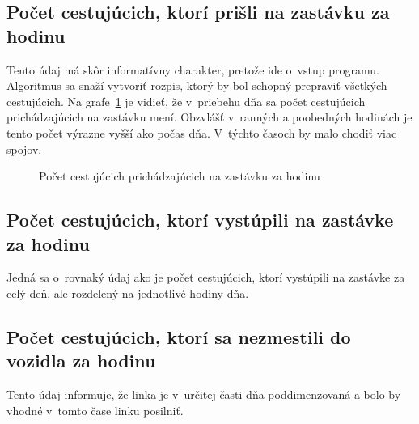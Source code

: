 \subsection*{Počet cestujúcich, ktorí prišli na zastávku za hodinu}
Tento údaj má skôr informatívny charakter, pretože ide o~vstup programu.
Algoritmus sa snaží vytvoriť rozpis, ktorý by bol schopný prepraviť všetkých cestujúcich.
Na grafe~\ref{fig:passengersArrivedPerHour} je vidieť, že v~priebehu dňa sa počet cestujúcich prichádzajúcich na zastávku mení.
Obzvlášť v~ranných a poobedných hodinách je tento počet výrazne vyšší ako počas dňa.
V~týchto časoch by malo chodiť viac spojov.
\begin{figure}[h]\label{fig:passengersArrivedPerHour}
  \centering
  \caption{Počet cestujúcich prichádzajúcich na zastávku za hodinu}
\end{figure}

\subsection*{Počet cestujúcich, ktorí vystúpili na zastávke za hodinu}
Jedná sa o~rovnaký údaj ako je počet cestujúcich, ktorí vystúpili na zastávke za celý deň, ale rozdelený na jednotlivé hodiny dňa.

\subsection*{Počet cestujúcich, ktorí sa nezmestili do vozidla za hodinu}
Tento údaj informuje, že linka je v~určitej časti dňa poddimenzovaná a bolo by vhodné v~tomto čase linku posilniť.

